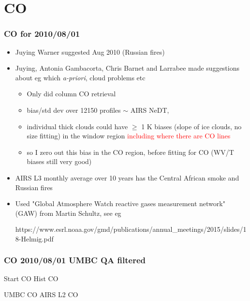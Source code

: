 \documentclass[10pt,t]{beamer}
\begin{document}
\section{CO}
\begin{frame}
  \frametitle{CO for 2010/08/01}
  \begin{itemize}
  \item Juying Warner suggested Aug 2010 (Russian fires)
  \item Juying,  Antonia Gambacorta,  Chris Barnet and Larrabee made suggestions about eg
    which \emph{a-priori}, cloud problems etc
    \begin{itemize}
    \item Only did column CO retrieval    
    \item bias/std dev over 12150 profiles $\sim$  AIRS NeDT,
    \item individual thick clouds could have $\geq$ 1 K biases (slope of ice clouds, no size fitting)
      in the window region \textcolor{red}{including where there are CO lines}
    \item so I zero out this bias in the CO region, before fitting for CO (WV/T biases still very good)
    \end{itemize}
  \item AIRS L3 monthly average over 10 years has the Central African smoke and Russian fires
  \item Used "Global Atmosphere Watch reactive gases measurement network"
    (GAW) from Martin Schultz, see eg
    \begin{small} https://www.esrl.noaa.gov/gmd/publications/annual\_meetings/2015/slides/18-Helmig.pdf \end{small}
  \end{itemize}
\end{frame}
\begin{frame}
  \frametitle{CO 2010/08/01 UMBC QA filtered}

  Start CO  \hspace{2.0in} Hist CO\\
  \begin{center}
  \end{center}

  UMBC CO \hspace{2.0in} AIRS L2 CO\\
  \begin{center}
  \end{center}

\end{frame}
\end{document}
